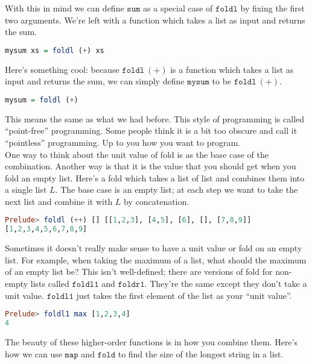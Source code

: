 \documentclass[a4paper,12pt]{article}
\newcommand{\kwa}[1]{\mathtt{#1}}
\begin{document}
\noindent
With this in mind we can define $\kwa{sum}$ as a special case of $\kwa{foldl}$ by fixing the first two arguments. We're left with a function which takes a list as input and returns the sum.

\begin{lstlisting}[language=Haskell]
mysum xs = foldl (+) xs
\end{lstlisting}

\noindent
Here's something cool: because $\kwa{foldl~ (+)}$ is a function which takes a list as input and returns the sum, we can simply define $\kwa{mysum}$ to be $\kwa{foldl~(+)}$.

\begin{lstlisting}[language=Haskell]
mysum = foldl (+)
\end{lstlisting}

\noindent
This means the same as what we had before. This style of programming is called ``point-free'' programming. Some people think it is a bit too obscure and call it ``pointless'' programming. Up to you how you want to program.\\

\noindent
One way to think about the unit value of fold is as the base case of the combination. Another way is that it is the value that you should get when you fold an empty list. Here's a fold which takes a list of list and combines them into a single list $L$. The base case is an empty list; at each step we want to take the next list and combine it with $L$ by concatenation.

\begin{lstlisting}[language=Haskell]
Prelude> foldl (++) [] [[1,2,3], [4,5], [6], [], [7,8,9]]
[1,2,3,4,5,6,7,8,9]
\end{lstlisting}

\noindent
Sometimes it doesn't really make sense to have a unit value or fold on an empty list. For example, when taking the maximum of a list, what should the maximum of an empty list be? This isn't well-defined; there are versions of fold for non-empty lists called $\kwa{foldl1}$ and $\kwa{foldr1}$. They're the same except they don't take a unit value. $\kwa{foldl1}$ just takes the first element of the list as your ``unit value''.

\begin{lstlisting}[language=Haskell]
Prelude> foldl1 max [1,2,3,4]
4
\end{lstlisting}

\noindent
The beauty of these higher-order functions is in how you combine them. Here's how we can use $\kwa{map}$ and $\kwa{fold}$ to find the size of the longest string in a list.
\end{document}
